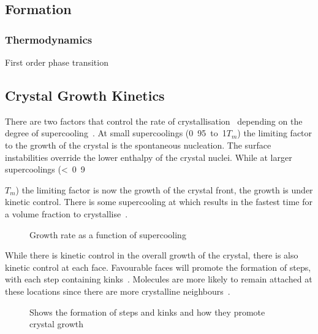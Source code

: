 \subsection{Formation}
\subsubsection{Thermodynamics}
First order phase transition

\subsection{Crystal Growth Kinetics}

There are two factors that control the rate of crystallisation~\cite{turnbull:69,ediger:08} depending on the degree of supercooling~. At small supercoolings (\si{0.95 to 1}{$T_m$}) the limiting factor to the growth of the crystal is the spontaneous nucleation. The surface instabilities override the lower enthalpy of the crystal nuclei. While at larger supercoolings (\si{< 0.9}{$T_m$) the limiting factor is now the growth of the crystal front, the growth is under kinetic control. There is some supercooling at which results in the fastest time for a volume fraction to crystallise~\cite{uhlmann:72}.

\begin{figure}
    \caption{Growth rate as a function of supercooling}
    \label{fig:crys growth}
\end{figure}

\begin{figure}
\end{figure}

While there is kinetic control in the overall growth of the crystal, there is also kinetic control at each face. Favourable faces will promote the formation of steps, with each step containing kinks~. Molecules are more likely to remain attached at these locations since there are more crystalline neighbours~\cite{chernov:61}.

\begin{figure}
    \caption{Shows the formation of steps and kinks and how they promote crystal growth}
    \label{fig:steps}
\end{figure}

\begin{itemize}


\end{itemize}}
